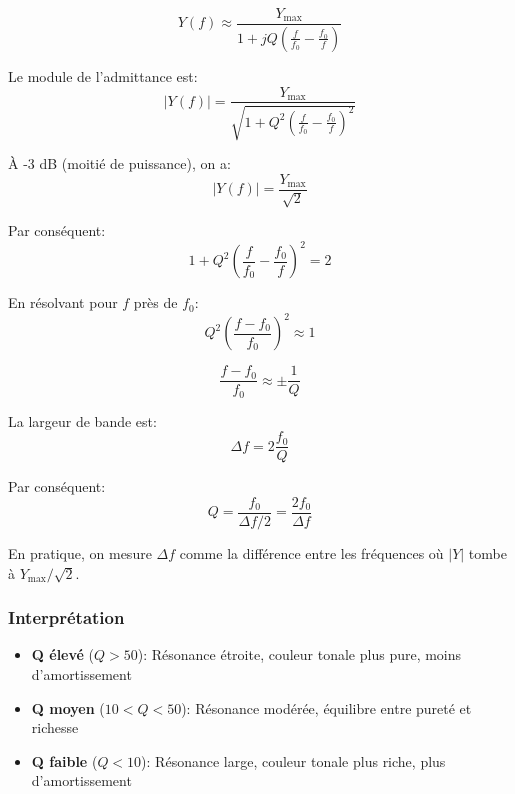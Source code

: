 \documentclass[12pt,a4paper,twocolumn]{article}
\newcommand{\admittance}{Y}
\newcommand{\freqzero}{f_0}
\begin{document}
\begin{equation}
\admittance(f) \approx \frac{\admittance_{\max}}{1 + j Q \left(\frac{f}{\freqzero} - \frac{\freqzero}{f}\right)}
\label{eq:admittance_resonateur}
\end{equation}

Le module de l'admittance est:
\begin{equation}
|\admittance(f)| = \frac{\admittance_{\max}}{\sqrt{1 + Q^2 \left(\frac{f}{\freqzero} - \frac{\freqzero}{f}\right)^2}}
\label{eq:admittance_module}
\end{equation}

À -3 dB (moitié de puissance), on a:
\begin{equation}
|\admittance(f)| = \frac{\admittance_{\max}}{\sqrt{2}}
\label{eq:admittance_3db}
\end{equation}

Par conséquent:
\begin{equation}
1 + Q^2 \left(\frac{f}{\freqzero} - \frac{\freqzero}{f}\right)^2 = 2
\label{eq:q_equation}
\end{equation}

En résolvant pour $f$ près de $\freqzero$:
\begin{equation}
Q^2 \left(\frac{f - \freqzero}{\freqzero}\right)^2 \approx 1
\label{eq:q_approximation}
\end{equation}

\begin{equation}
\frac{f - \freqzero}{\freqzero} \approx \pm \frac{1}{Q}
\label{eq:q_relation}
\end{equation}

La largeur de bande est:
\begin{equation}
\Delta f = 2 \frac{\freqzero}{Q}
\label{eq:largeur_bande}
\end{equation}

Par conséquent:
\begin{equation}
Q = \frac{\freqzero}{\Delta f/2} = \frac{2\freqzero}{\Delta f}
\label{eq:q_final}
\end{equation}

En pratique, on mesure $\Delta f$ comme la différence entre les fréquences où $|\admittance|$ tombe à $\admittance_{\max}/\sqrt{2}$.

\subsubsection{Interprétation}

\begin{itemize}
    \item \textbf{Q élevé} ($Q > 50$): Résonance étroite, couleur tonale plus pure, moins d'amortissement
    \item \textbf{Q moyen} ($10 < Q < 50$): Résonance modérée, équilibre entre pureté et richesse
    \item \textbf{Q faible} ($Q < 10$): Résonance large, couleur tonale plus riche, plus d'amortissement
\end{itemize}
\end{document}
